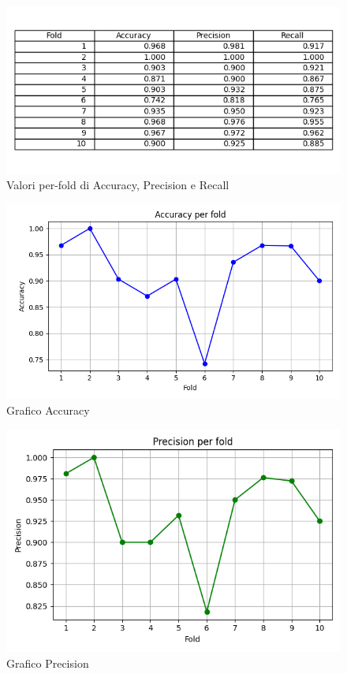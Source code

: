 \documentclass[a4paper,12pt]{report}
\begin{document}
\begin{figure}[h]
\centering
\includegraphics[width=14cm]{table.png}
\caption{Valori per-fold di Accuracy, Precision e Recall}
\end{figure}
\begin{figure}[h]
\centering
\includegraphics[width=\textwidth]{accuracy.png}
\caption{Grafico Accuracy}
\end{figure}
\begin{figure}[h]
\centering
\includegraphics[width=\textwidth]{precision.png}
\caption{Grafico Precision}
\end{figure}
\end{document}
